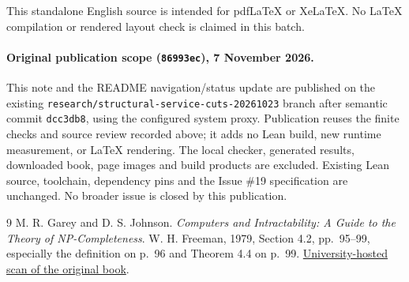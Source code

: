 \documentclass[11pt]{article}
\theoremstyle{remark}
\newcommand{\code}[1]{\nolinkurl{#1}}
\begin{document}
This standalone English source is intended for pdfLaTeX or XeLaTeX. No
LaTeX compilation or rendered layout check is claimed in this batch.

\paragraph{Original publication scope (\code{86993ec}), 7 November 2026.}
This note and the README navigation/status update are published on the existing
\code{research/structural-service-cuts-20261023} branch after semantic commit
\code{dcc3db8}, using the configured system proxy. Publication reuses the
finite checks and source review recorded above; it adds no Lean build,
new runtime measurement, or LaTeX rendering. The local checker, generated
results, downloaded book, page images and build products are excluded.
Existing Lean source, toolchain, dependency pins and the Issue \#19
specification are unchanged. No broader issue is closed by this publication.

\begin{thebibliography}{9}
M. R. Garey and D. S. Johnson.
\emph{Computers and Intractability: A Guide to the Theory of NP-Completeness}.
W. H. Freeman, 1979, Section 4.2, pp.~95--99, especially the definition
on p.~96 and Theorem 4.4 on p.~99.
\href{https://perso.limos.fr/~palafour/PAPERS/PDF/Garey-Johnson79.pdf}{University-hosted scan of the original book}.
\end{thebibliography}
\end{document}
